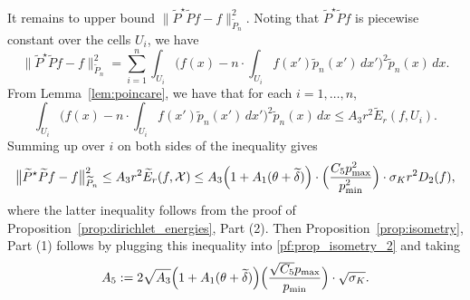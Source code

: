 \documentclass[twoside]{article}
\newcommand{\1}{\mathbf{1}}
\newcommand{\Xset}{\mathcal{X}}
\newcommand{\wt}[1]{\widetilde{#1}}
\theoremstyle{definition}
\theoremstyle{remark}
\begin{document}
It remains to upper bound $\bigl\|\wt{P}^{\star}\wt{P}f - f\bigr\|_{\wt{P}_n}^2$. Noting that $\wt{P}^{\star}\wt{P}f$ is piecewise constant over the cells $U_i$, we have
\begin{equation*}
\bigl\|\wt{P}^{\star}\wt{P}f - f\bigr\|_{\wt{P}_n}^2 = \sum_{i = 1}^{n} \int_{U_i} \biggl(f(x) - n\cdot\int_{U_i} f(x') \wt{p}_n(x') \,dx'\biggr)^2 \wt{p}_n(x) \,dx.
\end{equation*}
From Lemma~\ref{lem:poincare}, we have that for each $i = 1,\ldots,n$,
\begin{equation*}
\int_{U_i} \biggl(f(x) - n\cdot\int_{U_i} f(x') \wt{p}_n(x') \,dx'\biggr)^2 \wt{p}_n(x) \,dx \leq A_3r^2 \wt{E}_r(f,U_i).
\end{equation*}
Summing up over $i$ on both sides of the inequality gives
\begin{equation*}
\bigl\|\wt{P}^{\star}\wt{P}f - f\bigr\|_{\wt{P}_n}^2 \leq A_3r^2 \wt{E}_r(f,\Xset) \leq  A_3 \Bigl(1 + A_1(\theta + \wt{\delta})\Bigr) \cdot \Bigl(\frac{C_5 p_{\max}^2}{p_{\min}^2}\Bigr) \cdot \sigma_{K}r^2 D_2(f),
\end{equation*}
where the latter inequality follows from the proof of Proposition~\ref{prop:dirichlet_energies}, Part (2). Then Proposition~\ref{prop:isometry}, Part (1) follows by plugging this inequality into \eqref{pf:prop_isometry_2} and taking 
\begin{equation*}
A_5 := 2\sqrt{A_3} \Bigl(1 + A_1(\theta + \wt{\delta})\Bigr) \Bigl(\frac{\sqrt{C_5} p_{\max}}{p_{\min}}\Bigr) \cdot \sqrt{\sigma_{K}}.
\end{equation*}
\end{document}
